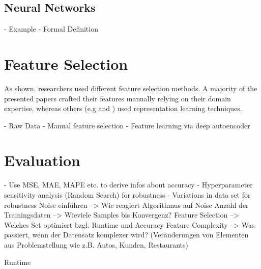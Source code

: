 \subsection{Neural Networks}
- Example
- Formal Definition

\section{Feature Selection}

As shown, researchers used different feature selection methods. A majority of the presented papers crafted their features manually relying on their domain expertise, whereas others (e.g \cite{Siripanpornchana2016_AnnWithDbnFS} and \cite{Huang2018_GBDT}) used representation learning techniques.


- Raw Data 
- Manual feature selection
- Feature learning via deep autoencoder

\section{Evaluation} 
- Use MSE, MAE, MAPE etc. to derive infos about accuracy
- Hyperparameter sensitivity analysis (Random Search) for robustness
- Variations in data set for robustness
Noise einführen 
--> Wie reagiert Algorithmus auf Noise
Anzahl der Trainingsdaten 
--> Wieviele Samples bis Konvergenz?
Feature Selection
--> Welches Set optimiert bzgl. Runtime und Accuracy
Feature Complexity
--> Was passiert, wenn der Datensatz komplexer wird? (Veränderungen von Elementen aus Problemstellung wie z.B. Autos, Kunden, Restaurants)

Runtime
